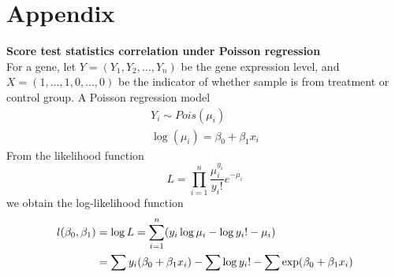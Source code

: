 \documentclass[12pt, a4paper]{article}
\begin{document}
	\section{Appendix}
	\begin{appendix}
		
		
		
		\textbf{
			Score test statistics correlation under Poisson regression}\\
		For a gene, let $Y= (Y_1, Y_2, \ldots, Y_n)$ be the gene expression level, and $X= (1, \ldots,
		1, 0, \ldots, 0)$ be the indicator of whether sample is from treatment or control group. A Poisson
		regression model 
		\begin{align*}\label{poisson}
			Y_i\sim Pois(\mu_i) \\
			\log(\mu_i) = \beta_0 +\beta_1 x_i
		\end{align*}
		From the likelihood function 
		\[L = \prod_{i=1}^n \frac{\mu_i^{y_i}}{y_i!}e^{-\mu_i}\]
		we obtain the log-likelihood function
		\begin{align}\label{poissonLikelihood}
			l(\beta_0, \beta_1) & = \log L = \sum_{i=1}^n(y_i\log \mu_i - \log y_i! -\mu_i) \\ \notag
			& = \sum y_i(\beta_0 +\beta_1x_i) - \sum \log y_i! - \sum \exp(\beta_0 + \beta_1x_i) \notag
		\end{align}
		

\end{appendix}
\end{document}
